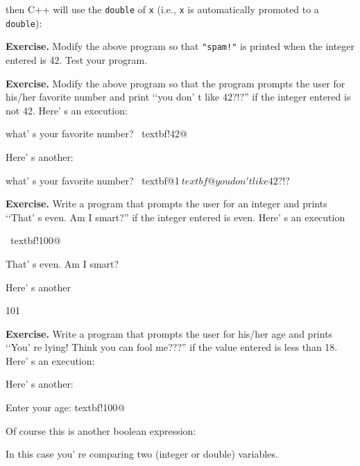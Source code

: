 
then C++ will use the \verb!double! of \verb!x! (i.e., \verb!x! is
automatically promoted to a \verb!double!):


\textbf{Exercise.} Modify the above program so that \verb~"spam!"~ is printed
when the integer entered is 42. Test your program.

\textbf{Exercise.} Modify the above program so that the program prompts the user
for his/her favorite number and print \lq\lq you don' t like
42?!?'' if the integer entered is not 42. Here' s an execution:
\begin{console}[commandchars=\~\!\@]
what' s your favorite number? ~textbf!42@ 
\end{console}
Here' s another:
\begin{console}[commandchars=\~\@\$]
what' s your favorite number? ~textbf@1$
~textbf@you don't like 42?!?$  
\end{console}

\textbf{Exercise.} Write a program that prompts the user for an integer
and prints \lq\lq That' s even. Am I smart?'' if the integer
entered is even. Here' s an execution
\begin{console}[commandchars=\~\!\@]
~textbf!100@

That' s even. Am I smart?
\end{console}

Here' s another
\begin{console}
101 
\end{console}

\textbf{Exercise.} Write a program that prompts the user for his/her age
and prints \lq\lq You' re lying! Think you can fool me???'' if
the value entered is less than 18. Here' s an execution:
Here' s another:

\begin{console}[commandchars=\~\!\@]
Enter your age: textbf!100@
\end{console}
Of course this is another boolean expression:
\begin{center}
\EMPHASIZE{[var1] [bool op] [var2]}
\end{center}
In this case you' re comparing two (integer or double)
variables.

